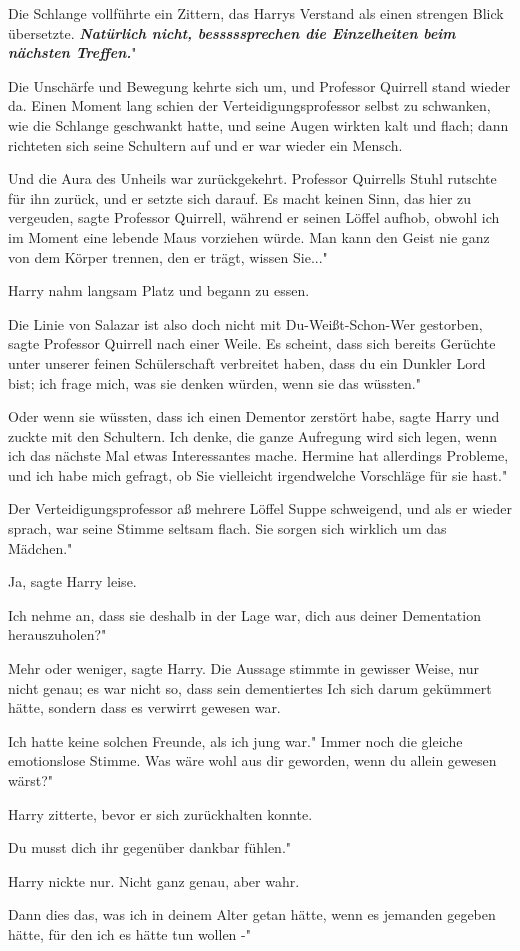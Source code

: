 Die Schlange vollführte ein Zittern, das Harrys Verstand als einen strengen
Blick übersetzte. \glqq \textbf{\emph{Natürlich nicht, besssssprechen die
Einzelheiten beim nächsten Treffen.}}"

Die Unschärfe und Bewegung kehrte sich um, und Professor Quirrell stand wieder
da. Einen Moment lang schien der Verteidigungsprofessor selbst zu schwanken, wie
die Schlange geschwankt hatte, und seine Augen wirkten kalt und flach; dann
richteten sich seine Schultern auf und er war wieder ein Mensch.

Und die Aura des Unheils war zurückgekehrt. Professor Quirrells Stuhl rutschte
für ihn zurück, und er setzte sich darauf. \glqq Es macht keinen Sinn, das hier
zu vergeuden\grqq{}, sagte Professor Quirrell, während er seinen Löffel aufhob,
\glqq obwohl ich im Moment eine lebende Maus vorziehen würde. Man kann den Geist
nie ganz von dem Körper trennen, den er trägt, wissen Sie..."

Harry nahm langsam Platz und begann zu essen.

\glqq Die Linie von Salazar ist also doch nicht mit Du-Weißt-Schon-Wer
gestorben\grqq{}, sagte Professor Quirrell nach einer Weile. \glqq Es scheint,
dass sich bereits Gerüchte unter unserer feinen Schülerschaft verbreitet haben,
dass du ein Dunkler Lord bist; ich frage mich, was sie denken würden, wenn sie
das wüssten."

\glqq Oder wenn sie wüssten, dass ich einen Dementor zerstört habe\grqq{}, sagte
Harry und zuckte mit den Schultern. \glqq Ich denke, die ganze Aufregung wird
sich legen, wenn ich das nächste Mal etwas Interessantes mache. Hermine hat
allerdings Probleme, und ich habe mich gefragt, ob Sie vielleicht irgendwelche
Vorschläge für sie hast."

Der Verteidigungsprofessor aß mehrere Löffel Suppe schweigend, und als er wieder
sprach, war seine Stimme seltsam flach. \glqq Sie sorgen sich wirklich um das
Mädchen."

\glqq Ja\grqq{}, sagte Harry leise.

\glqq Ich nehme an, dass sie deshalb in der Lage war, dich aus deiner
Dementation herauszuholen?"

\glqq Mehr oder weniger\grqq{}, sagte Harry. Die Aussage stimmte in gewisser
Weise, nur nicht genau; es war nicht so, dass sein dementiertes Ich sich darum
gekümmert hätte, sondern dass es verwirrt gewesen war.

\glqq Ich hatte keine solchen Freunde, als ich jung war." Immer noch die gleiche
emotionslose Stimme. \glqq Was wäre wohl aus dir geworden, wenn du allein
gewesen wärst?"

Harry zitterte, bevor er sich zurückhalten konnte.

\glqq Du musst dich ihr gegenüber dankbar fühlen."

Harry nickte nur. Nicht ganz genau, aber wahr.

\glqq Dann dies das, was ich in deinem Alter getan hätte, wenn es jemanden
gegeben hätte, für den ich es hätte tun wollen -"

